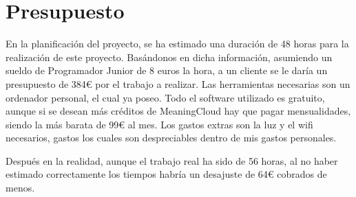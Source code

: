 
\chapter{Presupuesto}


En la planificación del proyecto, se ha estimado una duración de 48 horas para la realización de este proyecto. Basándonos en dicha información, asumiendo un sueldo de Programador Junior de 8 euros la hora, a un cliente se le daría un presupuesto de 384€ por el trabajo a realizar. Las herramientas necesarias son un ordenador personal, el cual ya poseo. Todo el software utilizado es gratuito, aunque si se desean más créditos de MeaningCloud hay que pagar mensualidades, siendo la más barata de 99€ al mes. Los gastos extras son la luz y el wifi necesarios, gastos los cuales son despreciables dentro de mis gastos personales.

Después en la realidad, aunque el trabajo real ha sido de 56 horas, al no haber estimado correctamente los tiempos habría un desajuste de 64€ cobrados de menos. 